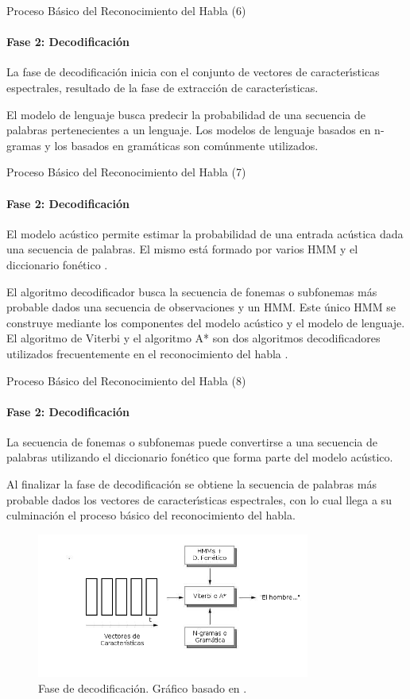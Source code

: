 \begin{frame}{Proceso B\'asico del Reconocimiento del Habla (6)}
\framesubtitle{Fase 2: Decodificaci\'on}
La fase de decodificaci\'on inicia con el conjunto de vectores de caracter{\'\i}sticas espectrales,
resultado de la fase de extracci\'on de caracter{\'\i}sticas.

El modelo de lenguaje busca predecir la probabilidad de una secuencia de palabras pertenecientes a un lenguaje.
Los modelos de lenguaje basados en n-gramas \cite{JelinekTheDevelopment1986} y los basados en 
gram\'aticas \cite{Wang2000} son com\'unmente utilizados.

\end{frame}

\begin{frame}{Proceso B\'asico del Reconocimiento del Habla (7)}
\framesubtitle{Fase 2: Decodificaci\'on}
El modelo ac\'ustico permite estimar la probabilidad de una entrada ac\'ustica dada una secuencia de palabras.
El mismo est\'a formado por varios HMM y el diccionario fon\'etico \cite{huang-handbook10}.

El algoritmo decodificador busca la secuencia de fonemas o subfonemas m\'as probable dados una 
secuencia de observaciones y un HMM. Este \'unico HMM se construye
mediante los componentes del modelo ac\'ustico y el modelo de lenguaje. El algoritmo de Viterbi y el 
algoritmo A* son dos algoritmos decodificadores utilizados frecuentemente en el reconocimiento del 
habla \cite{Jurafsky}.
\end{frame}

\begin{frame}{Proceso B\'asico del Reconocimiento del Habla (8)}
\framesubtitle{Fase 2: Decodificaci\'on}
La secuencia de fonemas o subfonemas puede convertirse a una secuencia de palabras utilizando el diccionario
fon\'etico que forma parte del modelo ac\'ustico.

Al finalizar la fase de decodificaci\'on se obtiene la secuencia de palabras m\'as probable dados los vectores
de caracter{\'\i}sticas espectrales, con lo cual llega a su culminaci\'on el proceso b\'asico
del reconocimiento del habla.

\begin{figure}[H] 
\centering
\includegraphics[width=0.8\textwidth]{./graphics/decodificacion.png}
\caption{Fase de decodificaci\'on. Gr\'afico basado en \cite{VerenichASR}.}
\label{figure:hmm}
\end{figure}
\end{frame}
